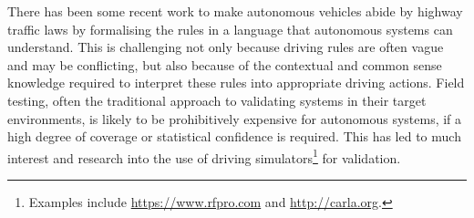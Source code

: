 There has been some recent work to make autonomous vehicles abide by highway traffic laws by formalising the rules in a language that autonomous systems can understand. This is challenging not only because driving rules are often vague and may be conflicting, but also because of the contextual and common sense knowledge required to interpret these rules into appropriate driving actions. 
%
Field testing, often the traditional approach to validating systems in their target environments, is likely to be prohibitively expensive for autonomous systems, if a high degree of coverage or statistical confidence is required. This has led to much interest and research into the use of driving simulators\footnote{Examples include \url{https://www.rfpro.com} and \url{http://carla.org}.} for validation. 
%
%
%
%

